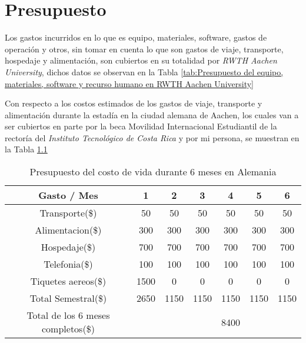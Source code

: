 

\chapter{Presupuesto}
\label{ch:Presupuesto}

Los gastos incurridos en lo que es equipo, materiales, software, gastos de operación y otros, sin
tomar en cuenta lo que son gastos de viaje, transporte, hospedaje y alimentación, son cubiertos
en su totalidad por \textit{RWTH Aachen University}, dichos datos se observan en la Tabla
\ref{tab:Presupuesto del equipo, materiales, software y recurso humano en RWTH Aachen University}

Con respecto a los costos estimados de los gastos de viaje, transporte y alimentación durante la
estadía en la ciudad alemana de Aachen, los cuales van a ser cubiertos en parte por la beca Movilidad
Internacional Estudiantil de la rectoría del \textit{Instituto Tecnológico de Costa Rica} y por mi persona,
se muestran en la Tabla \ref{tab:Presupuesto del costo de vida durante 6 meses en Alemania}

\begin{table}[ht]

  \caption{Presupuesto del costo de vida durante 6 meses en Alemania}
  \centering
  \begin{tabular}{| c | c | c | c | c | c | c |}
   \hline\hline
   Gasto / Mes 		& 1   & 2 & 3 & 4 & 5 & 6 			\\ \hline\hline
   Transporte(\$) 	& 50  & 50 & 50 & 50 & 50 & 50 			\\ \hline
   Alimentacion(\$) 	& 300 & 300 & 300 & 300 & 300 & 300 		\\ \hline
   Hospedaje(\$) 	& 700 & 700 & 700 & 700 & 700 & 700 		\\ \hline
   Telefonia(\$) 	& 100 & 100 & 100 & 100 & 100 & 100 		\\ \hline
   Tiquetes aereos(\$) & 1500 & 0 & 0 & 0 & 0 & 0 			\\ \hline
   Total Semestral(\$) & 2650 & 1150 & 1150 & 1150 & 1150 & 1150	\\ \hline
   Total de los 6 meses completos(\$) & \multicolumn{1}{r}{}  & \multicolumn{1}{r}{} & \multicolumn{1}{r}{} & \multicolumn{1}{r}{8400} & \multicolumn{1}{r}{} & \multicolumn{1}{r|}{} 	\\ \hline\hline

   
  \end{tabular}
  \label{tab:Presupuesto del costo de vida durante 6 meses en Alemania}
 
  
\end{table}


